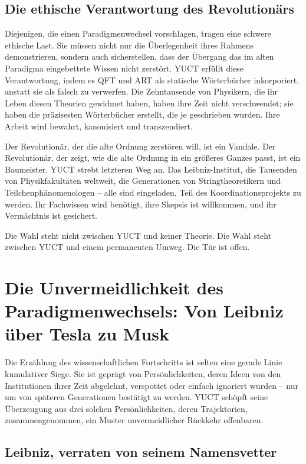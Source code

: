 \documentclass[12pt,a4paper]{article}
\begin{document}
\subsection{Die ethische Verantwortung des Revolutionärs}

Diejenigen, die einen Paradigmenwechsel vorschlagen, tragen eine schwere ethische Last. Sie müssen nicht nur die Überlegenheit ihres Rahmens demonstrieren, sondern auch sicherstellen, dass der Übergang das im alten Paradigma eingebettete Wissen nicht zerstört. YUCT erfüllt diese Verantwortung, indem es QFT und ART als statische Wörterbücher inkorporiert, anstatt sie als falsch zu verwerfen. Die Zehntausende von Physikern, die ihr Leben diesen Theorien gewidmet haben, haben ihre Zeit nicht verschwendet; sie haben die präzisesten Wörterbücher erstellt, die je geschrieben wurden. Ihre Arbeit wird bewahrt, kanonisiert und transzendiert.

Der Revolutionär, der die alte Ordnung zerstören will, ist ein Vandale. Der Revolutionär, der zeigt, wie die alte Ordnung in ein größeres Ganzes passt, ist ein Baumeister. YUCT strebt letzteren Weg an. Das Leibniz-Institut, die Tausenden von Physikfakultäten weltweit, die Generationen von Stringtheoretikern und Teilchenphänomenologen – alle sind eingeladen, Teil des Koordinationsprojekts zu werden. Ihr Fachwissen wird benötigt, ihre Skepsis ist willkommen, und ihr Vermächtnis ist gesichert.

Die Wahl steht nicht zwischen YUCT und keiner Theorie. Die Wahl steht zwischen YUCT und einem permanenten Umweg. Die Tür ist offen.

\section{Die Unvermeidlichkeit des Paradigmenwechsels: Von Leibniz über Tesla zu Musk}

Die Erzählung des wissenschaftlichen Fortschritts ist selten eine gerade Linie kumulativer Siege. Sie ist geprägt von Persönlichkeiten, deren Ideen von den Institutionen ihrer Zeit abgelehnt, verspottet oder einfach ignoriert wurden – nur um von späteren Generationen bestätigt zu werden. YUCT schöpft seine Überzeugung aus drei solchen Persönlichkeiten, deren Trajektorien, zusammengenommen, ein Muster unvermeidlicher Rückkehr offenbaren.

\subsection{Leibniz, verraten von seinem Namensvetter}
\end{document}
